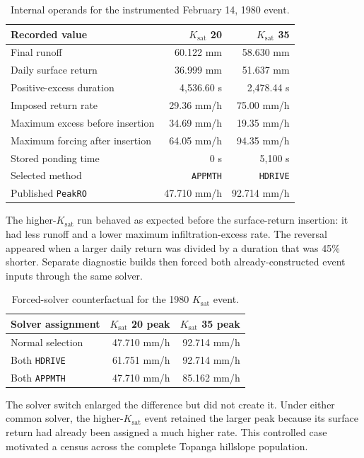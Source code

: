 \documentclass[11pt]{article}
\newcommand{\Ksat}{\ensuremath{K_{\mathrm{sat}}}}
\newcommand{\PeakRO}{\texttt{PeakRO}}
\begin{document}
\begin{table}[H]
  \centering
  \caption{Internal operands for the instrumented February 14, 1980 event.}
  \label{tab:instrumented-1980}
  \begin{tabular}{lrr}
    \toprule
    Recorded value & \Ksat{} 20 & \Ksat{} 35 \\
    \midrule
    Final runoff & 60.122 mm & 58.630 mm \\
    Daily surface return & 36.999 mm & 51.637 mm \\
    Positive-excess duration & 4,536.60 s & 2,478.44 s \\
    Imposed return rate & 29.36 mm/h & 75.00 mm/h \\
    Maximum excess before insertion & 34.69 mm/h & 19.35 mm/h \\
    Maximum forcing after insertion & 64.05 mm/h & 94.35 mm/h \\
    Stored ponding time & 0 s & 5,100 s \\
    Selected method & \texttt{APPMTH} & \texttt{HDRIVE} \\
    Published \PeakRO{} & 47.710 mm/h & 92.714 mm/h \\
    \bottomrule
  \end{tabular}
\end{table}

The higher-\Ksat{} run behaved as expected before the surface-return insertion:
it had less runoff and a lower maximum infiltration-excess rate. The reversal
appeared when a larger daily return was divided by a duration that was 45\%
shorter. Separate diagnostic builds then forced both already-constructed event
inputs through the same solver.

\begin{table}[H]
  \centering
  \caption{Forced-solver counterfactual for the 1980 \Ksat{} event.}
  \label{tab:forced-solvers}
  \begin{tabular}{lrr}
    \toprule
    Solver assignment & \Ksat{} 20 peak & \Ksat{} 35 peak \\
    \midrule
    Normal selection & 47.710 mm/h & 92.714 mm/h \\
    Both \texttt{HDRIVE} & 61.751 mm/h & 92.714 mm/h \\
    Both \texttt{APPMTH} & 47.710 mm/h & 85.162 mm/h \\
    \bottomrule
  \end{tabular}
\end{table}

The solver switch enlarged the difference but did not create it. Under either
common solver, the higher-\Ksat{} event retained the larger peak because its
surface return had already been assigned a much higher rate. This controlled
case motivated a census across the complete Topanga hillslope population.
\end{document}
